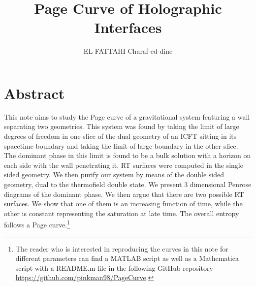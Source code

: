 \documentclass{easyclass}
\begin{document}
\begin{titlepage}
    \title{Page Curve of Holographic Interfaces}
    \author{EL FATTAHI Charaf-ed-dine}
    \maketitle
\end{titlepage}

\chapter*{Abstract}
    This note aims to study the Page curve of a gravitational system featuring a wall separating two geometries. This system was found by taking the limit of large degrees of freedom in one slice of the dual geometry of an ICFT sitting in its spacetime boundary and taking the limit of large boundary in the other slice. The dominant phase in this limit is found to be a bulk solution with a horizon on each side with the wall penetrating it. RT surfaces were computed in the single sided geometry. We then purify our system by means of the double sided geometry, dual to the thermofield double state. We present 3 dimensional Penrose diagrams of the dominant phase. We then argue that there are two possible RT surfaces. We show that one of them is an increasing function of time, while the other is constant representing the saturation at late time. The overall entropy follows a Page curve.\footnote{The reader who is interested in reproducing the curves in this note for different parameters can find a MATLAB script as well as a Mathematica script with a README.m file in the following GitHub repository \url{https://github.com/pinkman98/PageCurve}.}


\tableofcontents

\setcounter{chapter}{0}
\label{section 1}


\setcounter{chapter}{1}
\label{section 2}


\setcounter{chapter}{2}
\label{section 3}

\end{document}
